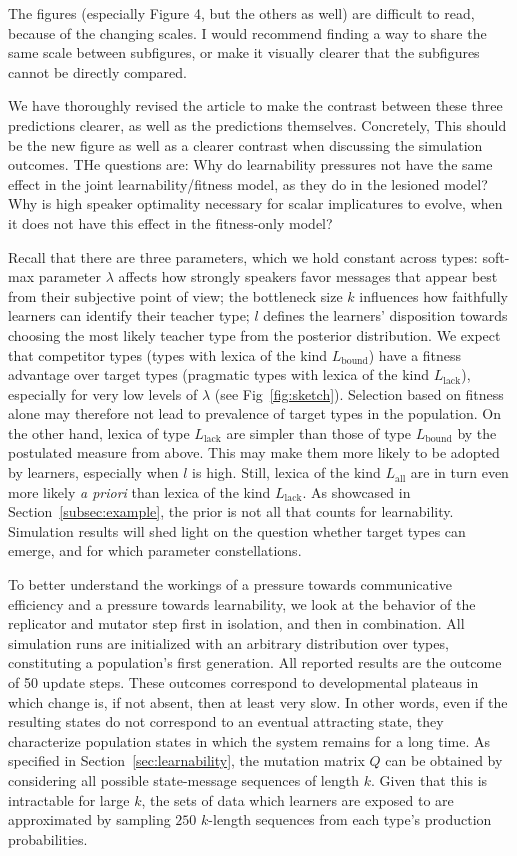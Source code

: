 \documentclass[a4paper, 11pt]{article}
\theoremstyle{Satz}
\newcommand{\hl}[1]{\textcolor[rgb]{.8,.33,.0}{#1}}%
\newcommand{\mylang}[1]{\ensuremath{L_{\text{#1}}}\xspace} %
\newcommand{\Lall}{\mylang{all}}
\newcommand{\Lbound}{\mylang{bound}}
\newcommand{\Llack}{\mylang{lack}}
\begin{document}
\hl{The figures (especially Figure 4, but the others as well) are difficult to read, because of the changing scales. I would recommend finding a way to share the same scale between subfigures, or make it visually clearer that the subfigures cannot be directly compared.}

\hl{We have thoroughly revised the article to make the contrast between these three predictions clearer, as well as the predictions themselves. Concretely, This should be the new figure as well as a clearer contrast when discussing the simulation outcomes. THe questions are: Why do learnability pressures not have the same effect in the joint learnability/fitness model, as they do in the lesioned model? Why is high speaker optimality necessary for scalar implicatures to evolve, when it does not have this effect in the fitness-only model?}


Recall that there are three parameters, which we hold constant across types: soft-max parameter $\lambda$ affects how strongly
speakers favor messages that appear best from their subjective point of view; the
bottleneck size $k$ influences how faithfully learners can identify their teacher type; $l$
defines the learners' disposition towards choosing the most likely teacher type from the
posterior distribution. We expect that competitor types (types with lexica of the kind
$\Lbound$) have a fitness advantage over target types (pragmatic types with lexica of the kind
$\Llack$), especially for very low levels of $\lambda$ (see Fig~\ref{fig:sketch}). Selection based on fitness alone may
therefore not lead to prevalence of target types in the population. On the other hand, lexica
of type $\Llack$ are simpler than those of type $\Lbound$ by the postulated measure from
above. This may make them more likely to be adopted by learners, especially when $l$ is high. Still, lexica of the kind $\Lall$ are in turn even more likely \emph{a priori} than lexica of the kind $\Llack$. As showcased in Section~\ref{subsec:example}, the prior is not all that counts for learnability. Simulation results will shed light on the question whether target
types can emerge, and for which parameter constellations.

To better understand the workings of a pressure towards communicative efficiency and a pressure
towards learnability, we look at the behavior of the replicator and mutator step first in
isolation, and then in combination. All simulation runs are initialized with an arbitrary
distribution over types, constituting a population's first generation. All reported results are
the outcome of 50 update steps. These outcomes correspond to developmental plateaus in which
change is, if not absent, then at least very slow. In other words, even if the resulting states
do not correspond to an eventual attracting state, they characterize population states in which the system remains for a long time. As specified in Section~\ref{sec:learnability}, the
mutation matrix $Q$ can be obtained by considering all possible state-message sequences of
length $k$. Given that this is intractable for large $k$, the sets of data which learners are
exposed to are approximated by sampling $250$ $k$-length sequences from each type's production
probabilities.
\end{document}
